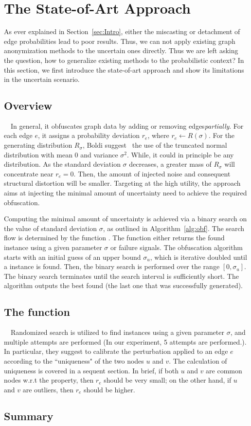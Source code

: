 \section{The State-of-Art Approach}
As ever explained in Section~\ref{sec:Intro}, either the miscasting or detachment of edge probabilities lead to poor results. Thus, we can not apply existing graph anonymization methods to the uncertain ones directly. 
Thus we are left asking the question, how to generalize existing methods to the probabilistic context?
In this section, we first introduce the state-of-art approach and show its limitations in the uncertain scenario.  

\subsection{Overview}~~In general, it obfuscates graph data by adding or removing edges\emph{partially}. For each edge $e$, it assigns a probability deviation $r_{e}$, where $r_{e} \leftarrow R(\sigma)$. For the generating distribution $R_{\sigma}$, Boldi {\etal} suggest~\cite{Boldi_Injecting_2012} the use of the truncated normal distribution with mean 0 and variance $\sigma^2$. While, it could in principle be any distribution. As the standard deviation $\sigma$ decreases, a greater mass of $R_{\sigma}$ will concentrate near $r_{e}=0$.  Then, the amount of injected noise and consequent structural distortion  will be smaller. Targeting at the high utility, the approach aims at injecting the minimal amount of uncertainty need to achieve the required obfuscation. 



Computing the minimal amount of uncertainty is achieved via a binary search on the value of standard deviation $\sigma$, as outlined in Algorithm~\ref{alg:obf}. The search flow is determined by the function {\genobf}. The function either returns the found {\keobf} instance using a given parameter $\sigma$ or failure signals. The obfuscation algorithm starts with an initial guess of an upper bound $\sigma_{u}$, which is iterative doubled until a {\keobf} instance is found. Then, the binary search is performed over the range $[0,\sigma_{u}]$. The binary search terminates until the search interval is sufficiently short. The algorithm outputs the best {\keobf} found (the last one that was successfully generated).


\subsection{The function {\genobf}}~~Randomized search is utilized to find {\keobf} instances using a given parameter $\sigma$, and multiple  attempts are performed (In our experiment, 5 attempts are performed.).  In particular, they suggest to calibrate the perturbation applied to an edge $e$ according to the ``uniqueness" of the two nodes $u$ and $v$. The calculation of uniqueness is covered in a sequent section. In brief, if both $u$ and $v$ are common nodes w.r.t the property, then $r_{e}$ should be very small; on the other hand, if $u$ and $v$ are outliers, then $r_{e}$ should be higher. 

\subsection{Summary} 

